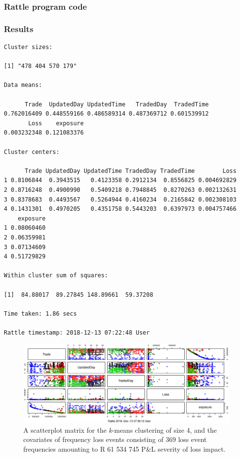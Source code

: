 \documentclass[]{DissertateUSU}
\begin{document}
\subsubsection{Rattle program code}

\subsubsection{Results}\begin{verbatim}
Cluster sizes:

[1] "478 404 570 179"

Data means:

      Trade  UpdatedDay UpdatedTime   TradedDay  TradedTime 
0.762016409 0.448559166 0.486589314 0.487369712 0.601539912 
       Loss    exposure 
0.003232348 0.121083376 

Cluster centers:

      Trade UpdatedDay UpdatedTime TradedDay TradedTime        Loss
1 0.8106844  0.3943515   0.4123358 0.2912134  0.8556825 0.004692829
2 0.8716248  0.4900990   0.5409218 0.7948845  0.8270263 0.002132631
3 0.8378683  0.4493567   0.5264944 0.4160234  0.2165842 0.002308103
4 0.1431301  0.4970205   0.4351758 0.5443203  0.6397973 0.004757466
    exposure
1 0.08060460
2 0.06359981
3 0.07134609
4 0.51729829

Within cluster sum of squares:

[1]  84.88017  89.27845 148.89661  59.37208

Time taken: 1.86 secs

Rattle timestamp: 2018-12-13 07:22:48 User
\end{verbatim}

\begin{figure}
\centering
\includegraphics[width=250mm,scale=1.5]{CA14MeansPlot.eps}
\caption{A scatterplot matrix for the \emph{k}-means clustering of size 4, and the covariates of frequency loss events consisting of 369 loss event frequencies amounting to R 61 534 745 P\&L severity of loss impact.}
\label{CA14MeansPlot}
\end{figure}
\end{document}
